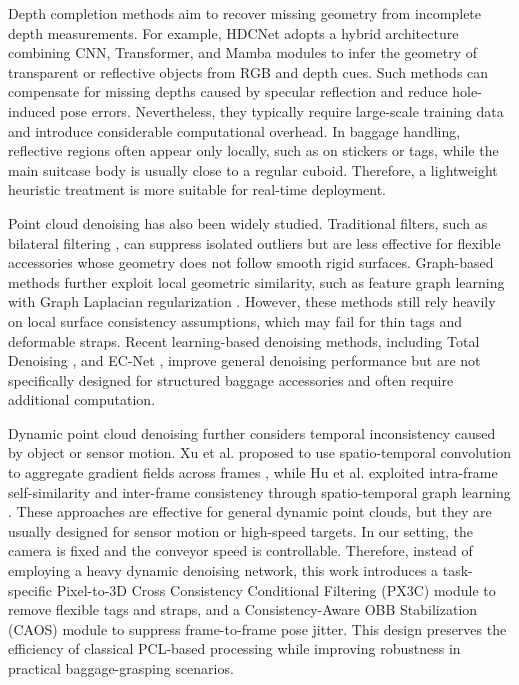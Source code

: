 Depth completion methods aim to recover missing geometry from incomplete depth measurements. For example, HDCNet \cite{xie2025hdcnet} adopts a hybrid architecture combining CNN, Transformer, and Mamba modules to infer the geometry of transparent or reflective objects from RGB and depth cues. Such methods can compensate for missing depths caused by specular reflection and reduce hole-induced pose errors. Nevertheless, they typically require large-scale training data and introduce considerable computational overhead. In baggage handling, reflective regions often appear only locally, such as on stickers or tags, while the main suitcase body is usually close to a regular cuboid. Therefore, a lightweight heuristic treatment is more suitable for real-time deployment.

Point cloud denoising has also been widely studied. Traditional filters, such as bilateral filtering \cite{digne2017bilateral, si2022lbf}, can suppress isolated outliers but are less effective for flexible accessories whose geometry does not follow smooth rigid surfaces. Graph-based methods further exploit local geometric similarity, such as feature graph learning with Graph Laplacian regularization \cite{hu2020feature}. However, these methods still rely heavily on local surface consistency assumptions, which may fail for thin tags and deformable straps. Recent learning-based denoising methods, including Total Denoising \cite{hermosilla2019total, rakotosaona2020pointcleannet}, and EC-Net \cite{yu2018ec}, improve general denoising performance but are not specifically designed for structured baggage accessories and often require additional computation.

Dynamic point cloud denoising further considers temporal inconsistency caused by object or sensor motion. Xu et al. proposed to use spatio-temporal convolution to aggregate gradient fields across frames \cite{hu2025dynamic}, while Hu et al. exploited intra-frame self-similarity and inter-frame consistency through spatio-temporal graph learning \cite{hu2021dynamic}. These approaches are effective for general dynamic point clouds, but they are usually designed for sensor motion or high-speed targets. In our setting, the camera is fixed and the conveyor speed is controllable. Therefore, instead of employing a heavy dynamic denoising network, this work introduces a task-specific Pixel-to-3D Cross Consistency Conditional Filtering (PX3C) module to remove flexible tags and straps, and a Consistency-Aware OBB Stabilization (CAOS) module to suppress frame-to-frame pose jitter. This design preserves the efficiency of classical PCL-based processing while improving robustness in practical baggage-grasping scenarios.

